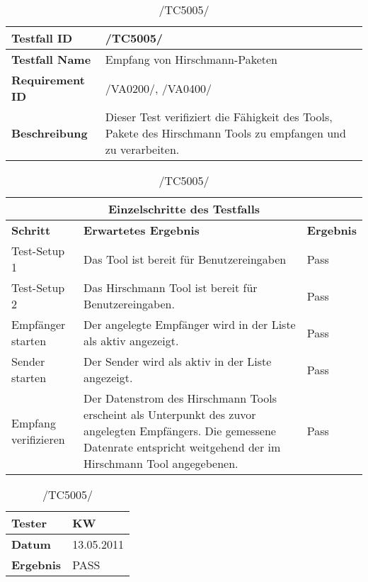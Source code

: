     \begin{table}[h]
        \caption{/TC5005/}
        \label{tab:TC5005}
        \begin{center}
            \begin{tabular}{|p{3.5cm}|p{11cm}|}
                \hline
                    \textbf{Testfall ID} & /TC5005/\\
                \hline
                    \textbf{Testfall Name} & Empfang von Hirschmann-Paketen\\
                \hline
                    \textbf{Requirement ID} & /VA0200/, /VA0400/\\
                \hline
                    \textbf{Beschreibung} & Dieser Test verifiziert die
                    Fähigkeit des Tools, Pakete des Hirschmann Tools zu
                    empfangen und zu verarbeiten.\\
                \hline
            \end{tabular}
            \begin{tabular}{|p{4cm}|p{7.8cm}|p{2.3cm}|}
\multicolumn{3}{|c|}{\textbf{Einzelschritte des Testfalls}} \\
                \hline
                    \textbf{Schritt} & \textbf{Erwartetes Ergebnis} & \textbf{Ergebnis}\\
                \hline
                    Test-Setup 1 &
                    Das Tool ist bereit für Benutzereingaben& Pass\\
                \hline
                    Test-Setup 2 &
                    Das Hirschmann Tool ist bereit für Benutzereingaben. & Pass\\
                \hline
                    Empfänger starten &
                    Der angelegte Empfänger wird in der Liste als aktiv
                    angezeigt.& Pass\\
                \hline
                    Sender starten &
                    Der Sender wird als aktiv in der Liste angezeigt.& Pass\\
                \hline
                    Empfang verifizieren &
                    Der Datenstrom des Hirschmann Tools erscheint als
                    Unterpunkt des zuvor angelegten Empfängers. Die
                    gemessene Datenrate entspricht weitgehend der im Hirschmann
                    Tool angegebenen.& Pass\\
                \hline
            \end{tabular}
                   \begin{tabular}{|p{3.5cm}|p{11cm}|}
                \textbf{Tester} & KW\\
                \hline
                \textbf{Datum} & 13.05.2011\\
                \hline
                \textbf{Ergebnis} & PASS\\
                \hline
            \end{tabular}
        \end{center}
    \end{table}

